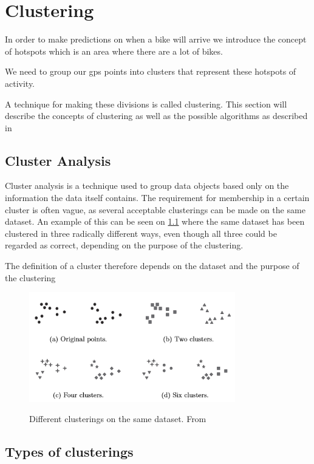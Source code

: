 \chapter{Clustering}

In order to make predictions on when a bike will arrive we introduce the concept of hotspots which is an area where there are a lot of bikes.

We need to group our gps points into clusters that represent these hotspots of activity.

A technique for making these divisions is called clustering.
This section will describe the concepts of clustering as well as the possible algorithms as described in \citet{pang2006introduction}

\section{Cluster Analysis}
Cluster analysis is a technique used to group data objects based only on the information the data itself contains.
The requirement for membership in a certain cluster is often vague, as several acceptable clusterings can be made on the same dataset.
An example of this can be seen on \cref{clusterings} where the same dataset has been clustered in three radically different ways, even though all three could be regarded as correct, depending on the purpose of the clustering.

The definition of a cluster therefore depends on the dataset and the purpose of the clustering 

\begin{figure}[H]
\includegraphics[width=0.8\textwidth]{graphics/clusterings}
\centering
\label{clusterings}
\caption{Different clusterings on the same dataset. From \citet{pang2006introduction}}
\end{figure}

\section{Types of clusterings}

